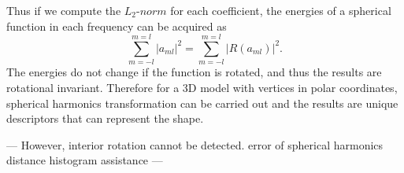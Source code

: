 \begin{enumerate}
Thus if we compute the $L_{2}$-$norm$ for each coefficient, the energies of a spherical function in each frequency can be acquired as
\begin{equation} \label{l2norm}
\sum_{m=-l}^{m=l}|a_{ml}|^{2}=\sum_{m=-l}^{m=l}|R(a_{ml})|^{2}.
\end{equation}
The energies do not change if the function is rotated, and thus the results are rotational invariant. Therefore for a 3D model with vertices in polar coordinates, spherical harmonics transformation can be carried out and the results are unique descriptors that can represent the shape. 

---
However, interior rotation cannot be detected. 
error of spherical harmonics
distance histogram assistance
---

\end{enumerate}